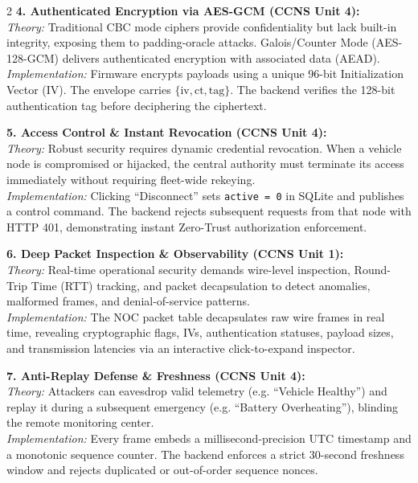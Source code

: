 \documentclass[10pt,a4paper]{article}
\begin{document}
\begin{multicols}{2}
\textbf{\textcolor{cvisred}{4. Authenticated Encryption via AES-GCM (CCNS Unit 4):}}\\
\textit{Theory:} Traditional CBC mode ciphers provide confidentiality but lack built-in integrity, exposing them to padding-oracle attacks. Galois/Counter Mode (AES-128-GCM) delivers authenticated encryption with associated data (AEAD).\\
\textit{Implementation:} Firmware encrypts payloads using a unique 96-bit Initialization Vector (IV). The envelope carries $\{\text{iv}, \text{ct}, \text{tag}\}$. The backend verifies the 128-bit authentication tag before deciphering the ciphertext.

\textbf{\textcolor{cvisblue}{5. Access Control \& Instant Revocation (CCNS Unit 4):}}\\
\textit{Theory:} Robust security requires dynamic credential revocation. When a vehicle node is compromised or hijacked, the central authority must terminate its access immediately without requiring fleet-wide rekeying.\\
\textit{Implementation:} Clicking ``Disconnect'' sets \texttt{active = 0} in SQLite and publishes a control command. The backend rejects subsequent requests from that node with HTTP 401, demonstrating instant Zero-Trust authorization enforcement.

\textbf{\textcolor{cvisgreen}{6. Deep Packet Inspection \& Observability (CCNS Unit 1):}}\\
\textit{Theory:} Real-time operational security demands wire-level inspection, Round-Trip Time (RTT) tracking, and packet decapsulation to detect anomalies, malformed frames, and denial-of-service patterns.\\
\textit{Implementation:} The NOC packet table decapsulates raw wire frames in real time, revealing cryptographic flags, IVs, authentication statuses, payload sizes, and transmission latencies via an interactive click-to-expand inspector.

\textbf{\textcolor{cvispurple}{7. Anti-Replay Defense \& Freshness (CCNS Unit 4):}}\\
\textit{Theory:} Attackers can eavesdrop valid telemetry (e.g. ``Vehicle Healthy'') and replay it during a subsequent emergency (e.g. ``Battery Overheating''), blinding the remote monitoring center.\\
\textit{Implementation:} Every frame embeds a millisecond-precision UTC timestamp and a monotonic sequence counter. The backend enforces a strict 30-second freshness window and rejects duplicated or out-of-order sequence nonces.


\end{multicols}
\end{document}
